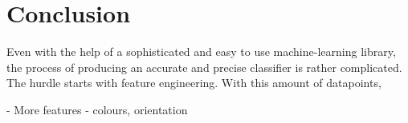 \documentclass[dissertation.tex]{subfiles}
\begin{document}
\chapter{Conclusion}
Even with the help of a sophisticated and easy to use machine-learning library, the process of producing an accurate and precise classifier is rather complicated. The hurdle starts with feature engineering. With this amount of datapoints,

- More features - colours, orientation
\end{document}
